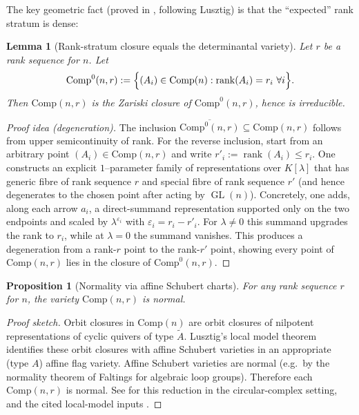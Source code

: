 \documentclass[11pt,oneside]{amsbook}
\numberwithin{equation}{section}
\theoremstyle{plain}
\newtheorem{proposition}[theorem]{Proposition}
\newtheorem{lemma}[theorem]{Lemma}
\theoremstyle{definition}
\theoremstyle{remark}
\DeclareMathOperator{\rank}{\mathrm{rank}}
\DeclareMathOperator{\GL}{\mathrm{GL}}
\begin{document}
The key geometric fact (proved in \cite{CarrollChindrisKinserWeyman2018ModuliSpecialBiserial}, following Lusztig) is that the ``expected'' rank stratum is dense:

\begin{lemma}[Rank-stratum closure equals the determinantal variety]
\label{lem:comp_rank_stratum_closure}
Let $r$ be a rank sequence for $n$.
Let
\[
\mathrm{Comp}^0(n,r):=\Bigl\{(A_i)\in \mathrm{Comp}(n): \rank(A_i)= r_i\ \forall i\Bigr\}.
\]
Then $\mathrm{Comp}(n,r)$ is the Zariski closure of $\mathrm{Comp}^0(n,r)$, hence is irreducible.
\end{lemma}

\begin{proof}[Proof idea (degeneration)]
The inclusion $\overline{\mathrm{Comp}^0(n,r)}\subseteq \mathrm{Comp}(n,r)$ follows from upper semicontinuity of rank.
For the reverse inclusion, start from an arbitrary point $(A_i)\in\mathrm{Comp}(n,r)$ and write $r'_i:=\rank(A_i)\le r_i$.
One constructs an explicit $1$--parameter family of representations over $K[\lambda]$ that has generic fibre of rank sequence $r$ and special fibre of rank sequence $r'$ (and hence degenerates to the chosen point after acting by $\GL(n)$).
Concretely, one adds, along each arrow $a_i$, a direct-summand representation supported only on the two endpoints and scaled by $\lambda^{\varepsilon_i}$ with $\varepsilon_i=r_i-r'_i$.
For $\lambda\neq 0$ this summand upgrades the rank to $r_i$, while at $\lambda=0$ the summand vanishes.
This produces a degeneration from a rank-$r$ point to the rank-$r'$ point, showing every point of $\mathrm{Comp}(n,r)$ lies in the closure of $\mathrm{Comp}^0(n,r)$.
\end{proof}

\begin{proposition}[Normality via affine Schubert charts]
\label{prop:comp_normal}
For any rank sequence $r$ for $n$, the variety $\mathrm{Comp}(n,r)$ is normal.
\end{proposition}

\begin{proof}[Proof sketch]
Orbit closures in $\mathrm{Comp}(n)$ are orbit closures of nilpotent representations of cyclic quivers of type $\widetilde{A}$.
Lusztig's local model theorem identifies these orbit closures with affine Schubert varieties in an appropriate (type $A$) affine flag variety.
Affine Schubert varieties are normal (e.g.\ by the normality theorem of Faltings for algebraic loop groups).
Therefore each $\mathrm{Comp}(n,r)$ is normal.
See \cite{CarrollChindrisKinserWeyman2018ModuliSpecialBiserial} for this reduction in the circular-complex setting, and the cited local-model inputs \cite{Lusztig1990CanonicalBases,Faltings2003LoopGroups}.
\end{proof}
\end{document}
